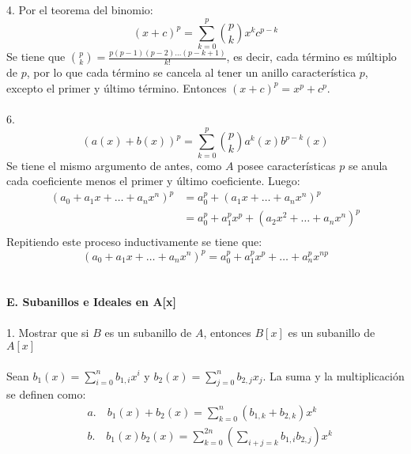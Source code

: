 \documentclass{article}
\begin{document}
\\
\\
4. Por el teorema del binomio:
\begin{equation*}
    (x+c)^p = \sum_{k=0}^{p} \binom{p}{k} x^k c^{p-k}
\end{equation*}
Se tiene que $\binom{p}{k}=\frac{p(p-1)(p-2)\dots (p-k+1)}{k!}$, es decir, cada término es múltiplo de $p$, por lo que cada término se cancela al tener un anillo característica $p$, excepto el primer y último término. Entonces $(x+c)^p=x^p + c^p$.
\\
\\
6.
\begin{equation*}
    (a(x)+b(x))^{p} = \sum_{k=0}^{p} \binom{p}{k} a^{k}(x)b^{p-k}(x)
\end{equation*}
Se tiene el mismo argumento de antes, como $A$ posee características $p$ se anula cada coeficiente menos el primer y último coeficiente. Luego:
\begin{equation*}
\begin{aligned}
    (a_0 + a_1x + \dots + a_n x^n)^{p} &= a_{0}^p + (a_1x + \dots + a_n x^n)^p \\
    &= a_{0}^{p} + a_{1}^{p}x^p + (a_{2}x^{2}+\dots+a_nx^{n})^{p} \\
\end{aligned}
\end{equation*}
Repitiendo este proceso inductivamente se tiene que:
\begin{equation*}
    (a_0 + a_1x + \dots + a_n x^n)^{p}=a_{0}^{p}+a_{1}^{p}x^{p}+\dots+a_{n}^{p}x^{np}
\end{equation*}
\\
\\
\textbf{E. Subanillos e Ideales en A[x]}
\\
\\
1. Mostrar que si $B$ es un subanillo de $A$, entonces $B[x]$ es un subanillo de $A[x]$
\\
\\
Sean $b_{1}(x)=\sum_{i=0}^{n}b_{1,i}x^{i}$ y $b_{2}(x)=\sum_{j=0}^{n}b_{2,j}x_{j}$. La suma y la multiplicación se definen como:
\begin{equation*}
\begin{aligned}
    &a. \quad b_{1}(x)+b_{2}(x)=\sum_{k=0}^{n}(b_{1,k}+b_{2,k})x^{k} \\
    &b. \quad b_{1}(x)b_{2}(x)=\sum_{k=0}^{2n} \left( \sum_{i+j=k} b_{1,i}b_{2,j}\right) x^{k}
\end{aligned}
\end{equation*}
\end{document}
